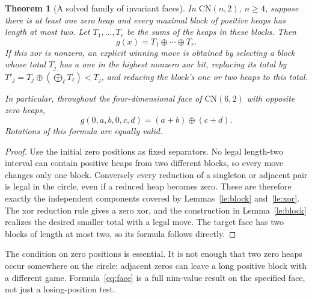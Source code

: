 \documentclass[11pt,a4paper]{article}
\newtheorem{theorem}{Theorem}[section]
\theoremstyle{definition}
\theoremstyle{remark}
\begin{document}
\begin{theorem}[A solved family of invariant faces]\label{th:faces}
In $\mathrm{CN}(n,2)$, $n\geq4$, suppose there is at least one zero heap and every maximal block of positive heaps has length at most two. Let $T_1,\ldots,T_r$ be the sums of the heaps in these blocks. Then
\[
 g(x)=T_1\oplus\cdots\oplus T_r.
\]
If this xor is nonzero, an explicit winning move is obtained by selecting a block whose total $T_j$ has a one in the highest nonzero xor bit, replacing its total by
$T'_j=T_j\oplus(\bigoplus_\ell T_\ell)<T_j$, and reducing the block's one or two heaps to this total.

In particular, throughout the four-dimensional face of $\mathrm{CN}(6,2)$ with opposite zero heaps,
\begin{equation}\label{eq:face}
 g(0,a,b,0,c,d)=(a+b)\oplus(c+d).
\end{equation}
Rotations of this formula are equally valid.
\end{theorem}
\begin{proof}
Use the initial zero positions as fixed separators. No legal length-two interval can contain positive heaps from two different blocks, so every move changes only one block. Conversely every reduction of a singleton or adjacent pair is legal in the circle, even if a reduced heap becomes zero. These are therefore exactly the independent components covered by Lemmas~\ref{le:block} and~\ref{le:xor}. The xor reduction rule gives a zero xor, and the construction in Lemma~\ref{le:block} realizes the desired smaller total with a legal move. The target face has two blocks of length at most two, so its formula follows directly.
\end{proof}

The condition on zero positions is essential. It is not enough that two zero heaps occur somewhere on the circle: adjacent zeros can leave a long positive block with a different game. Formula~\eqref{eq:face} is a full nim-value result on the specified face, not just a losing-position test.
\end{document}

